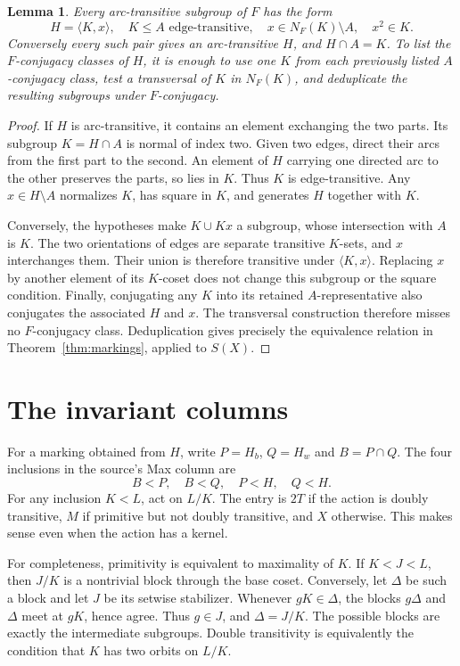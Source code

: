\documentclass[11pt]{article}
\newtheorem{lemma}[theorem]{Lemma}
\theoremstyle{definition}\newtheorem{definition}[theorem]{Definition}
\begin{document}
\begin{lemma}\label{lem:subdivision-reuse}
Every arc-transitive subgroup of $F$ has the form
\[
 H=\langle K,x\rangle,\quad K\le A\text{ edge-transitive},\quad
 x\in N_F(K)\setminus A,\quad x^2\in K.
\]
Conversely every such pair gives an arc-transitive $H$, and
$H\cap A=K$.  To list the $F$-conjugacy classes of $H$, it is enough
to use one $K$ from each previously listed $A$-conjugacy class,
test a transversal of $K$ in $N_F(K)$, and deduplicate the resulting
subgroups under $F$-conjugacy.
\end{lemma}
\begin{proof}
If $H$ is arc-transitive, it contains an element exchanging the two
parts.  Its subgroup $K=H\cap A$ is normal of index two.  Given two
edges, direct their arcs from the first part to the second.  An
element of $H$ carrying one directed arc to the other preserves
the parts, so lies in $K$.  Thus $K$ is edge-transitive.  Any
$x\in H\setminus A$ normalizes $K$, has square in $K$, and generates
$H$ together with $K$.

Conversely, the hypotheses make $K\cup Kx$ a subgroup, whose
intersection with $A$ is $K$.  The two orientations of edges are
separate transitive $K$-sets, and $x$ interchanges them.  Their union
is therefore transitive under $\langle K,x\rangle$.
Replacing $x$ by another element of its $K$-coset does not change
this subgroup or the square condition.  Finally, conjugating any
$K$ into its retained $A$-representative also conjugates the associated
$H$ and $x$.  The transversal construction therefore misses no
$F$-conjugacy class.  Deduplication gives precisely the equivalence
relation in Theorem~\ref{thm:markings}, applied to $S(X)$.
\end{proof}

\section{The invariant columns}
For a marking obtained from $H$, write $P=H_b$, $Q=H_w$ and
$B=P\cap Q$.  The four inclusions in the source's Max column are
\[
                       B<P,\quad B<Q,\quad P<H,\quad Q<H.
\]
For any inclusion $K<L$, act on $L/K$.  The entry is $2T$ if the
action is doubly transitive, $M$ if primitive but not doubly transitive,
and $X$ otherwise.  This makes sense even when the action has a kernel.

For completeness, primitivity is equivalent to maximality of $K$.
If $K<J<L$, then $J/K$ is a nontrivial block through the base coset.
Conversely, let $\Delta$ be such a block and let $J$ be its setwise
stabilizer.  Whenever $gK\in\Delta$, the blocks $g\Delta$ and
$\Delta$ meet at $gK$, hence agree.  Thus $g\in J$, and
$\Delta=J/K$.  The possible blocks are exactly the intermediate
subgroups.  Double transitivity is equivalently the condition that
$K$ has two orbits on $L/K$.
\end{document}
